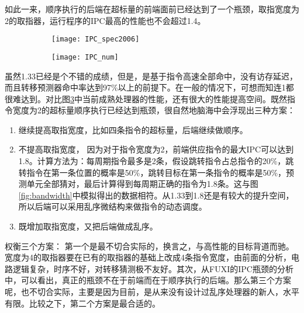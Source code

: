 	如此一来，顺序执行的后端在超标量的前端面前已经达到了一个瓶颈，取指宽度为2的取指器，运行程序的IPC最高的性能也不会超过1.4。
	\begin{figure}[!htbp]
		\centering
	    \begin{subfigure}[b]{\textwidth}
			\texttt{[image: IPC\_spec2006]}
			\caption{}
			\label{fig:ipc_cmp_fig}
		\end{subfigure}
		\begin{subfigure}[b]{\textwidth}
			\texttt{[image: IPC\_num]}
			\caption{}
			\label{fig:ipc_cmp_tbl}
		\end{subfigure}
		\label{fig:ipc_cmp}
	\end{figure}

	虽然1.33已经是个不错的成绩，但是，是基于指令高速全部命中，没有访存延迟，而且转移预测器命中率达到97\%以上的前提下。在一般的情况下，可想而知连1都很难达到。对比图\ref{fig:ipc_cmp}中当前成熟处理器的性能，还有很大的性能提高空间。既然指令宽度为2的超标量顺序执行已经达到瓶颈，很自然地脑海中会浮现出三种方案：
	\begin{enumerate}[label=(\alph*)]
		\item 继续提高取指宽度，比如四条指令的超标量，后端继续做顺序。
		\item 不提高取指宽度， 因为对于指令宽度为2，前端供应指令的最大IPC可以达到1.8。计算方法为：每周期指令最多是2条，假设跳转指令占总指令的20\%，跳转指令在第一条位置的概率是50\%，跳转目标在第一条指令的概率是50\%，预测单元全部猜对，最后计算得到每周期正确的指令为1.8条。这与图\ref{fig:bandwidth}中模拟得出的数据相符。从1.33到1.8还是有较大的提升空间，所以后端可以采用乱序微结构来做指令的动态调度。
		\item 既增加取指宽度，又把后端做成乱序。
	\end{enumerate}

	权衡三个方案： 第一个是最不切合实际的，换言之，与高性能的目标背道而驰。宽度为4的取指器要在已有的取指器的基础上改成4条指令宽度，由前面的分析，电路逻辑复杂，时序不好，对转移猜测极不友好。其次，从FUXI的IPC瓶颈的分析中，可以看出，真正的瓶颈不在于前端而在于顺序执行的后端。那么第三个方案呢，也不切合实际，主要是因为目前，是从来没有设计过乱序处理器的新人，水平有限。比较之下，第二个方案是最合适的。


